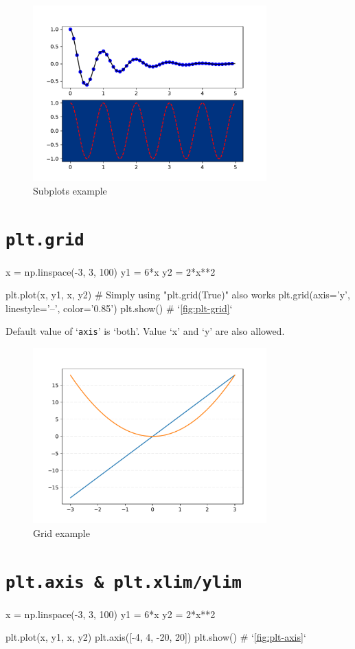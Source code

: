 \documentclass{report}
\begin{document}
\begin{figure}[!htb]
  \centering
  \includegraphics[width=90mm]{plt-subplot}
  \caption{Subplots example}
  \label{fig:plt-subplot}
\end{figure}

\section{\texttt{plt.grid}} 
\begin{py}
x = np.linspace(-3, 3, 100)
y1 = 6*x
y2 = 2*x**2

plt.plot(x, y1, x, y2)
# Simply using "plt.grid(True)" also works
plt.grid(axis='y', linestyle='--', color='0.85')
plt.show() # `\autoref{fig:plt-grid}`
\end{py}

Default value of `\texttt{axis}' is `both'. Value `x' and `y' are also allowed.

\begin{figure}[!htb]
  \centering
  \includegraphics[width=90mm]{plt-grid}
  \caption{Grid example}
  \label{fig:plt-grid}
\end{figure}

\section{\texttt{plt.axis \& plt.xlim/ylim}}
\begin{py}
x = np.linspace(-3, 3, 100)
y1 = 6*x
y2 = 2*x**2

plt.plot(x, y1, x, y2)
plt.axis([-4, 4, -20, 20])
plt.show() # `\autoref{fig:plt-axis}`
\end{py}
\end{document}
